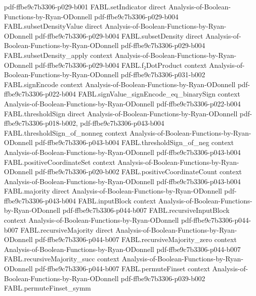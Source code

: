 \begin{theorem}
  {pdf-ffbe9c7b3306-p029-b001}
\proofstep
  {FABL.setIndicator}
  {direct}
  {Analysis-of-Boolean-Functions-by-Ryan-ODonnell}
  {pdf-ffbe9c7b3306-p029-b004}
\proofstep
  {FABL.subsetDensityValue}
  {direct}
  {Analysis-of-Boolean-Functions-by-Ryan-ODonnell}
  {pdf-ffbe9c7b3306-p029-b004}
\proofstep
  {FABL.subsetDensity}
  {direct}
  {Analysis-of-Boolean-Functions-by-Ryan-ODonnell}
  {pdf-ffbe9c7b3306-p029-b004}
\proofstep
  {FABL.subsetDensity_apply}
  {context}
  {Analysis-of-Boolean-Functions-by-Ryan-ODonnell}
  {pdf-ffbe9c7b3306-p029-b004}
\proofstep
  {FABL.f₂DotProduct}
  {context}
  {Analysis-of-Boolean-Functions-by-Ryan-ODonnell}
  {pdf-ffbe9c7b3306-p031-b002}
\proofstep
  {FABL.signEncode}
  {context}
  {Analysis-of-Boolean-Functions-by-Ryan-ODonnell}
  {pdf-ffbe9c7b3306-p022-b004}
\proofstep
  {FABL.signValue_signEncode_eq_binarySign}
  {context}
  {Analysis-of-Boolean-Functions-by-Ryan-ODonnell}
  {pdf-ffbe9c7b3306-p022-b004}
\proofstep
  {FABL.thresholdSign}
  {direct}
  {Analysis-of-Boolean-Functions-by-Ryan-ODonnell}
  {pdf-ffbe9c7b3306-p018-b002,
    pdf-ffbe9c7b3306-p043-b004}
\proofstep
  {FABL.thresholdSign_of_nonneg}
  {context}
  {Analysis-of-Boolean-Functions-by-Ryan-ODonnell}
  {pdf-ffbe9c7b3306-p043-b004}
\proofstep
  {FABL.thresholdSign_of_neg}
  {context}
  {Analysis-of-Boolean-Functions-by-Ryan-ODonnell}
  {pdf-ffbe9c7b3306-p043-b004}
\proofstep
  {FABL.positiveCoordinateSet}
  {context}
  {Analysis-of-Boolean-Functions-by-Ryan-ODonnell}
  {pdf-ffbe9c7b3306-p020-b002}
\proofstep
  {FABL.positiveCoordinateCount}
  {context}
  {Analysis-of-Boolean-Functions-by-Ryan-ODonnell}
  {pdf-ffbe9c7b3306-p043-b004}
\proofstep
  {FABL.majority}
  {direct}
  {Analysis-of-Boolean-Functions-by-Ryan-ODonnell}
  {pdf-ffbe9c7b3306-p043-b004}
\proofstep
  {FABL.inputBlock}
  {context}
  {Analysis-of-Boolean-Functions-by-Ryan-ODonnell}
  {pdf-ffbe9c7b3306-p044-b007}
\proofstep
  {FABL.recursiveInputBlock}
  {context}
  {Analysis-of-Boolean-Functions-by-Ryan-ODonnell}
  {pdf-ffbe9c7b3306-p044-b007}
\proofstep
  {FABL.recursiveMajority}
  {direct}
  {Analysis-of-Boolean-Functions-by-Ryan-ODonnell}
  {pdf-ffbe9c7b3306-p044-b007}
\proofstep
  {FABL.recursiveMajority_zero}
  {context}
  {Analysis-of-Boolean-Functions-by-Ryan-ODonnell}
  {pdf-ffbe9c7b3306-p044-b007}
\proofstep
  {FABL.recursiveMajority_succ}
  {context}
  {Analysis-of-Boolean-Functions-by-Ryan-ODonnell}
  {pdf-ffbe9c7b3306-p044-b007}
\proofstep
  {FABL.permuteFinset}
  {context}
  {Analysis-of-Boolean-Functions-by-Ryan-ODonnell}
  {pdf-ffbe9c7b3306-p039-b002}
\proofstep
  {FABL.permuteFinset_symm}

\end{theorem}
